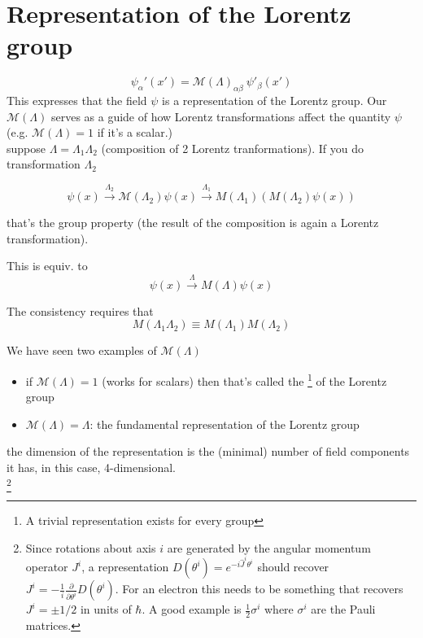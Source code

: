 \documentclass[11pt]{article}
\begin{document}
	\section*{Representation of the Lorentz group}
	
	\[ \psi_\alpha '(x') = \mathcal{M}(\Lambda)_{\alpha\beta}\ \psi'_\beta (x')\]
  This expresses that the field $\psi$ is a representation of the Lorentz group. Our $\mathcal{M}(\Lambda)$ serves as a guide of how Lorentz transformations affect the quantity $\psi$ (e.g. $\mathcal{M}(\Lambda) = 1$ if it's a scalar.)\\
  
	suppose $\Lambda = \Lambda_1 \Lambda_2$ (composition of 2 Lorentz tranformations). If you do transformation $\Lambda_2$
	
	\[ \psi(x) \xrightarrow{\Lambda_2} \mathcal{M} (\Lambda_2) \psi(x) \xrightarrow{\Lambda_1} M(\Lambda_1) (M(\Lambda_2)\psi(x))\]
	
	that's the group property (the result of the composition is again a Lorentz transformation).
	
	This is equiv. to 
	\[ \psi(x) \xrightarrow{\Lambda} M(\Lambda) \psi(x)\]
	
	The consistency requires that \[ M(\Lambda_1\Lambda_2) \equiv M(\Lambda_1) M(\Lambda_2)\]


	We have seen two examples of $\mathcal{M}(\Lambda)$ 
	
	\begin{itemize}
			\item if $\mathcal{M}(\Lambda) = 1$ (works for scalars) then that's called the \footnote{A trivial representation exists for every group} of the Lorentz group
			
			\item $\mathcal{M}(\Lambda) = \Lambda$: the fundamental representation of the Lorentz group
			
	\end{itemize}

	the dimension of the representation is the (minimal) number of field components it has, in this case, 4-dimensional.\\
	
	 \footnote{Since rotations about axis $i$ are generated by the angular momentum operator $J^i$, a representation $D(\theta^i) = e^{-i\hat{J}^i\theta^i}$ should recover $J^i = -\frac{1}{i} \frac{\partial}{\partial \theta^i}D(\theta^i)$. For an electron this needs to be something that recovers $J^i = \pm 1/2$ in units of $\hbar$. A good example is $\frac{1}{2}\sigma^i$ where $\sigma^i$ are the Pauli matrices.}\\
	
\end{document}

